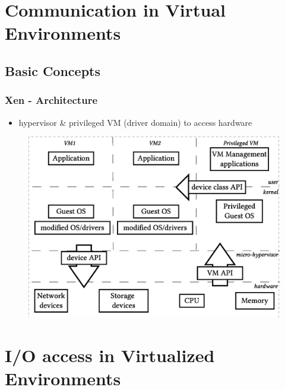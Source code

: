 \documentclass[red,slidestop,notes,compress,mathserif]{beamer}
\begin{document}
\section{Communication in Virtual Environments}

\subsection{Basic Concepts}

\begin{frame}
\frametitle{Xen - Architecture}
\begin{itemize}
\item hypervisor \& privileged VM (driver domain) to access hardware
\end{itemize}
\begin{figure}
\center
\includegraphics[width=.65\linewidth]{figures/paravirt.eps}
\end{figure}
\end{frame}

\section{I/O access in Virtualized Environments}
\end{document}

